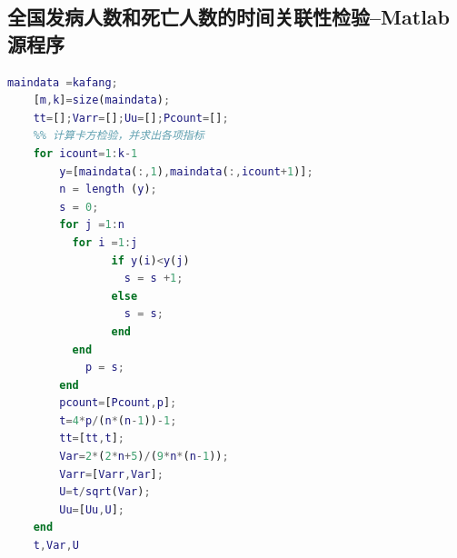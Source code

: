 \documentclass{whutmod}
\begin{document}
\subsection{全国发病人数和死亡人数的时间关联性检验--Matlab 源程序}
\begin{lstlisting}[language=Matlab]
    maindata =kafang;
    [m,k]=size(maindata);
    tt=[];Varr=[];Uu=[];Pcount=[];
    %% 计算卡方检验，并求出各项指标
    for icount=1:k-1
        y=[maindata(:,1),maindata(:,icount+1)];
        n = length (y);
        s = 0;
        for j =1:n
          for i =1:j
                if y(i)<y(j)
                  s = s +1;
                else
                  s = s;
                end
          end
            p = s;
        end
        pcount=[Pcount,p];
        t=4*p/(n*(n-1))-1;
        tt=[tt,t];
        Var=2*(2*n+5)/(9*n*(n-1));
        Varr=[Varr,Var];
        U=t/sqrt(Var);
        Uu=[Uu,U];   
    end
    t,Var,U
\end{lstlisting}
\end{document}
